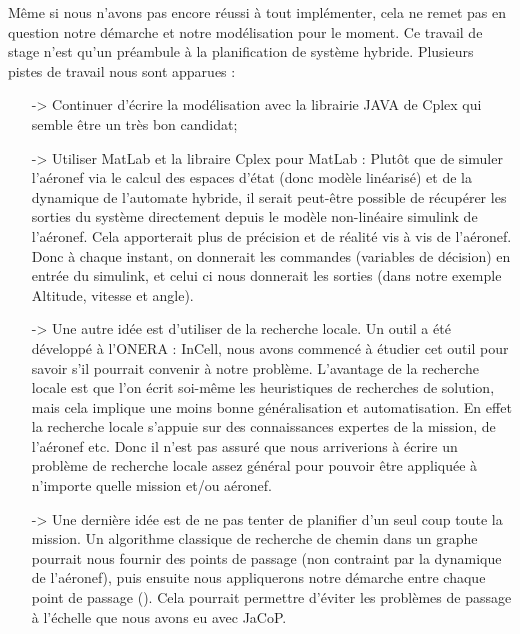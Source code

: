 Même si nous n'avons pas encore réussi à tout implémenter, cela ne remet pas en question notre démarche et notre modélisation pour le moment. Ce travail de stage n'est qu'un préambule à la planification de système hybride. Plusieurs pistes de travail nous sont apparues : 

\begin{itemize}
\item[->] Continuer d'écrire la modélisation avec la librairie JAVA de Cplex qui semble être un très bon candidat;
\item[->] Utiliser MatLab et la libraire Cplex pour MatLab : Plutôt que de simuler l'aéronef via le calcul des espaces d'état (donc modèle linéarisé) et de la dynamique de l'automate hybride, il serait peut-être possible de récupérer les sorties du système directement depuis le modèle non-linéaire simulink de l'aéronef. Cela apporterait plus de précision et de réalité vis à vis de l'aéronef. Donc à chaque instant, on donnerait les commandes (variables de décision) en entrée du simulink, et celui ci nous donnerait les sorties (dans notre exemple Altitude, vitesse et angle).
\item[->] Une autre idée est d'utiliser de la recherche locale. Un outil a été développé à l'ONERA : InCell, nous avons commencé à étudier cet outil pour savoir s'il pourrait convenir à notre problème. L'avantage de la recherche locale est que l'on écrit soi-même les heuristiques de recherches de solution, mais cela implique une moins bonne généralisation et automatisation. En effet la recherche locale s'appuie sur des connaissances expertes de la mission, de l'aéronef etc. Donc il n'est pas assuré que nous arriverions à écrire un problème de recherche locale assez général pour pouvoir être appliquée à n'importe quelle mission et/ou aéronef.
\item[->] Une dernière idée est de ne pas tenter de planifier d'un seul coup toute la mission. Un algorithme classique de recherche de chemin dans un graphe pourrait nous fournir des points de passage (non contraint par la dynamique de l'aéronef), puis ensuite nous appliquerons notre démarche entre chaque point de passage (\cite{chanthery_planification_2005}\cite{dicheva_planification_2012}). Cela pourrait permettre d'éviter les problèmes de passage à l'échelle que nous avons eu avec JaCoP.
\end{itemize}